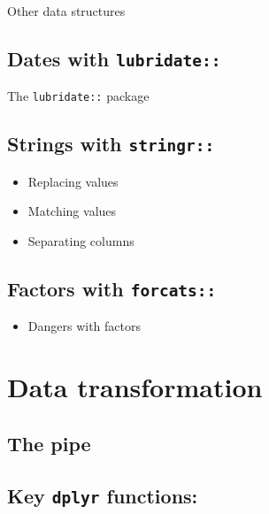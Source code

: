 \documentclass[]{book}
\providecommand{\tightlist}{%
  \setlength{\itemsep}{0pt}\setlength{\parskip}{0pt}}
\begin{document}
Other data structures

\hypertarget{dates-with-lubridate}{%
\section{\texorpdfstring{Dates with \texttt{lubridate::}}{Dates with lubridate::}}\label{dates-with-lubridate}}

The \texttt{lubridate::} package

\hypertarget{strings-with-stringr}{%
\section{\texorpdfstring{Strings with \texttt{stringr::}}{Strings with stringr::}}\label{strings-with-stringr}}

\begin{itemize}
\tightlist
\item
  Replacing values
\item
  Matching values
\item
  Separating columns
\end{itemize}

\hypertarget{factors-with-forcats}{%
\section{\texorpdfstring{Factors with \texttt{forcats::}}{Factors with forcats::}}\label{factors-with-forcats}}

\begin{itemize}
\tightlist
\item
  Dangers with factors
\end{itemize}

\hypertarget{data-transformation}{%
\chapter{Data transformation}\label{data-transformation}}

\hypertarget{the-pipe}{%
\section{The pipe}\label{the-pipe}}

\hypertarget{key-dplyr-functions}{%
\section{\texorpdfstring{Key \texttt{dplyr} functions:}{Key dplyr functions:}}\label{key-dplyr-functions}}
\end{document}
